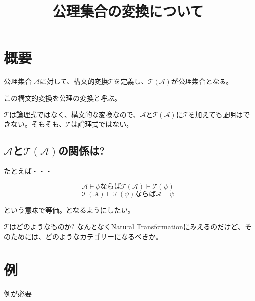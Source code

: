 \documentclass[10pt, oneside]{jarticle}   	%
\title{公理集合の変換について}
\author{\myname}
\date{}							%
\begin{document}
\maketitle

\section{概要}
公理集合 $\mathcal{A}$に対して、構文的変換$\mathcal{T}$を定義し、$\mathcal{T}(\mathcal{A})$が公理集合となる。

この構文的変換を公理の変換と呼ぶ。

$\mathcal{T}$は論理式ではなく、構文的な変換なので、$\mathcal{A}$と$\mathcal{T}(\mathcal{A})$に$\mathcal{T}$を加えても証明はできない。そもそも、$\mathcal{T}$は論理式ではない。

\subsection{$\mathcal{A}$と$\mathcal{T}(\mathcal{A})$の関係は?}
たとえば・・・

$$\mathcal{A}\vdash \psi ならば \mathcal{T}(\mathcal{A}) \vdash \mathcal{T}(\psi)$$
$$\mathcal{T}(\mathcal{A}) \vdash \mathcal{T}(\psi) ならば \mathcal{A}\vdash \psi $$

という意味で等価。となるようにしたい。

$\mathcal{T}$はどのようなものか? なんとなくNatural Transformationにみえるのだけど、そのためには、どのようなカテゴリーになるべきか。

%


\section{例}
例が必要
\end{document}
